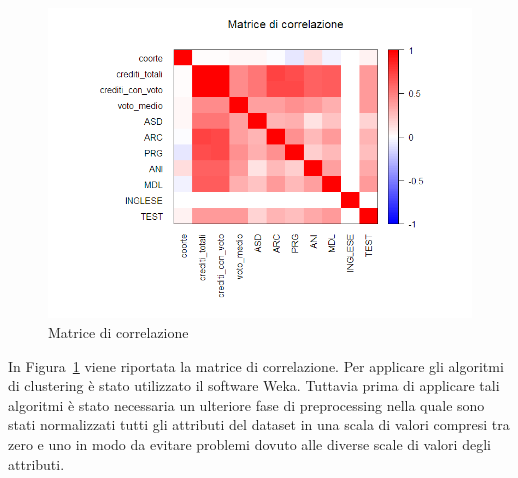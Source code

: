 \documentclass[12pt]{article}
\begin{document}
\begin{figure}[H]
	\includegraphics[width=\textwidth]{img/corMatrix.png}
	\caption{Matrice di correlazione}
	\label{fig:cMatrix}
\end{figure}

In Figura~\ref{fig:cMatrix} viene riportata la matrice di correlazione.
Per applicare gli algoritmi di clustering è stato utilizzato il software Weka. Tuttavia prima di applicare tali algoritmi è stato necessaria un ulteriore fase di preprocessing
nella quale sono stati normalizzati tutti gli attributi del data\-set in una scala di valori compresi tra zero e uno in modo da evitare problemi dovuto alle diverse scale di valori degli attributi.
\end{document}
